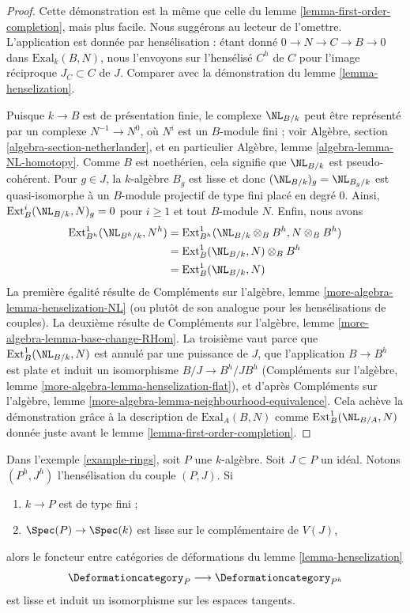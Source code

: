 \begin{proof}
Cette démonstration est la même que celle du
lemme \ref{lemma-first-order-completion}, mais plus facile. Nous suggérons au
lecteur de l'omettre.
L'application est donnée par hensélisation : étant donné $0 \to N \to C \to B \to 0$
dans $\text{Exal}_k(B, N)$, nous l'envoyons sur
l'hensélisé $C^h$
de $C$ pour l'image réciproque $J_C \subset C$ de $J$.
Comparer avec la démonstration du lemme \ref{lemma-henselization}.

\medskip\noindent
Puisque $k \to B$ est de présentation finie, le complexe
$\NL_{B/k}$ peut être représenté par un complexe
$N^{-1} \to N^0$, où $N^i$ est un $B$-module fini ; voir
Algèbre, section \ref{algebra-section-netherlander}, et
en particulier
Algèbre, lemme \ref{algebra-lemma-NL-homotopy}.
Comme $B$ est noethérien, cela signifie que $\NL_{B/k}$
est pseudo-cohérent. Pour $g \in J$, la $k$-algèbre $B_g$
est lisse et donc $(\NL_{B/k})_g = \NL_{B_g/k}$
est quasi-isomorphe à un $B$-module projectif de type fini placé en degré $0$.
Ainsi, $\text{Ext}^i_B(\NL_{B/k}, N)_g = 0$ pour $i \geq 1$
et tout $B$-module $N$. Enfin, nous avons
\begin{align*}
\text{Ext}^1_{B^h}(\NL_{B^h/k}, N^h)
& =
\text{Ext}^1_{B^h}(\NL_{B/k} \otimes_B B^h, N \otimes_B B^h) \\
& =
\text{Ext}^1_B(\NL_{B/k}, N) \otimes_B B^h \\
& =
\text{Ext}^1_B(\NL_{B/k}, N)
\end{align*}
La première égalité résulte de
Compléments sur l'algèbre, lemme \ref{more-algebra-lemma-henselization-NL}
(ou plutôt de son analogue pour les hensélisations de couples).
La deuxième résulte de
Compléments sur l'algèbre, lemme \ref{more-algebra-lemma-base-change-RHom}.
La troisième vaut parce que $\text{Ext}^1_B(\NL_{B/k}, N)$ est annulé par une puissance de $J$,
que l'application $B \to B^h$ est plate et induit un isomorphisme
$B/J \to B^h/JB^h$ (Compléments sur l'algèbre, lemme
\ref{more-algebra-lemma-henselization-flat}), et d'après
Compléments sur l'algèbre, lemme \ref{more-algebra-lemma-neighbourhood-equivalence}.
Cela achève la démonstration grâce à la description de $\text{Exal}_A(B, N)$
comme $\text{Ext}^1_B(\NL_{B/A}, N)$ donnée juste avant le
lemme \ref{lemma-first-order-completion}.
\end{proof}

\begin{lemma}
\label{lemma-smooth-henselization}
Dans l'exemple \ref{example-rings}, soit $P$ une $k$-algèbre.
Soit $J \subset P$ un idéal.
Notons $(P^h, J^h)$ l'hensélisation du couple $(P, J)$. Si
\begin{enumerate}
\item $k \to P$ est de type fini ;
\item $\Spec(P) \to \Spec(k)$ est lisse sur le complémentaire de $V(J)$,
\end{enumerate}
alors le foncteur entre catégories de déformations du
lemme \ref{lemma-henselization}
$$
\Deformationcategory_P \longrightarrow \Deformationcategory_{P^h}
$$
est lisse et induit un isomorphisme sur les espaces tangents.
\end{lemma}

